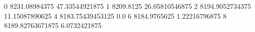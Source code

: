 0 8231.08984375 47.33544921875
1 8209.8125 26.05810546875
2 8194.9052734375 11.15087890625
4 8183.75439453125 0.0
6 8184.9765625 1.22216796875
8 8189.82763671875 6.0732421875
